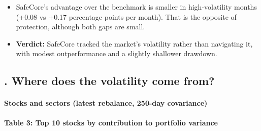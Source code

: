 \documentclass[11pt,preprint]{elsarticle}
\numberwithin{equation}{section}
\numberwithin{figure}{section}
\numberwithin{table}{section}
\def\tightlist{} %
\begin{document}
\begin{itemize}
\tightlist
\item
  SafeCore's advantage over the benchmark is smaller in high-volatility
  months (+0.08 vs +0.17 percentage points per month). That is the
  opposite of protection, although both gaps are small.
\item
  \textbf{Verdict:} SafeCore tracked the market's volatility rather than
  navigating it, with modest outperformance and a slightly shallower
  drawdown.
\end{itemize}

\subsection{. Where does the volatility come
from?}\label{where-does-the-volatility-come-from}

\paragraph{Stocks and sectors (latest rebalance, 250-day
covariance)}\label{stocks-and-sectors-latest-rebalance-250-day-covariance}

\textbf{Table 3: Top 10 stocks by contribution to portfolio variance}
\end{document}
